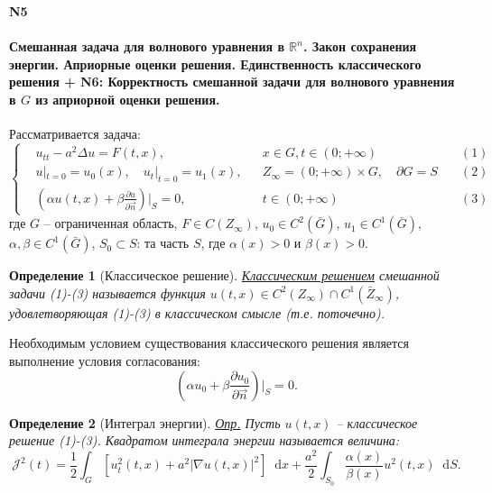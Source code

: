 \documentclass[12pt, a4paper]{article}
\newcommand{\R}{\mathbb{R}}
\newcommand{\dd}{\mathop{}\!\mathrm{d}} %
\newtheorem{definition}[theorem]{Определение}
\renewcommand{\proofname}{Доказательство}
\begin{document}
\newtheorem{theorem}{Теорема}
\newtheorem{definition}{Определение}
\newtheorem{lemma}{Лемма}
\newenvironment{proof}[1][\proofname]{\par\noindent\textit{#1.}\quad}{\hfill$\square$}
\renewcommand{\proofname}{Доказательство}






\noindent\textbf{N5}
\paragraph*{Смешанная задача для волнового уравнения в $\R^n$. Закон сохранения энергии. Априорные оценки решения. Единственность классического решения + N6: Корректность смешанной задачи для волнового уравнения в $G$ из априорной оценки решения.}

Рассматривается задача:
$$
\left\{
\begin{aligned}
&u_{tt} - a^2 \Delta u = F(t,x), && x \in G, t \in (0;+\infty) \quad &(1) \\
&u|_{t=0} = u_0(x), \quad u_t|_{t=0} = u_1(x), && Z_\infty = (0;+\infty) \times G, \quad \partial G = S \quad &(2) \\
&\left(\alpha u(t,x) + \beta \frac{\partial u}{\partial \vec{n}}\right)\Big|_S = 0, && t \in (0;+\infty) \quad &(3)
\end{aligned}
\right.
$$
где $G$ -- ограниченная область, $F \in C(Z_\infty)$, $u_0 \in C^2(\bar{G})$, $u_1 \in C^1(\bar{G})$, $\alpha, \beta \in C^1(\bar{G})$, $S_0 \subset S$: та часть $S$, где $\alpha(x) > 0$ и $\beta(x) > 0$.

\begin{definition}[Классическое решение]
\label{def:classical_solution}
\underline{Классическим решением} смешанной задачи (1)-(3) называется функция $u(t,x) \in C^2(Z_\infty) \cap C^1(\bar{Z}_\infty)$, удовлетворяющая (1)-(3) в классическом смысле (т.е. поточечно).
\end{definition}

Необходимым условием существования классического решения является выполнение условия согласования:
\begin{equation*}
\left(\alpha u_0 + \beta \frac{\partial u_0}{\partial \vec{n}}\right)\Big|_S = 0.
\end{equation*}

\begin{definition}[Интеграл энергии]
\label{def:energy_integral}
\underline{Опр.} Пусть $u(t,x)$ -- классическое решение (1)-(3). Квадратом интеграла энергии называется величина:
\begin{equation*}
\mathcal{J}^2(t) = \frac{1}{2} \int_G [u_t^2(t,x) + a^2 |\nabla u(t,x)|^2] \dd x + \frac{a^2}{2} \int_{S_0} \frac{\alpha(x)}{\beta(x)} u^2(t,x) \dd S.
\end{equation*}
\end{definition}
\end{document}
